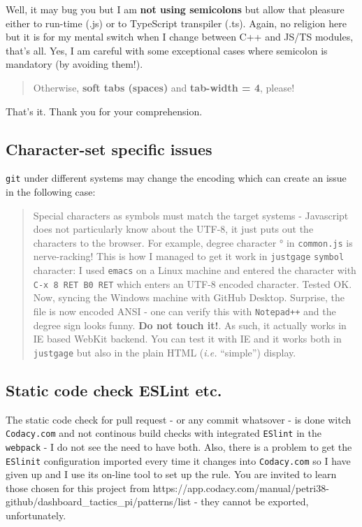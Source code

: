 \documentclass[11pt]{article}
\begin{document}
    Well, it may bug you but I am \textbf{not using semicolons} but allow
that pleasure either to run-time (.js) or to TypeScript transpiler
(.ts). Again, no religion here but it is for my mental switch when I
change between C++ and JS/TS modules, that's all. Yes, I am careful with
some exceptional cases where semicolon is mandatory (by avoiding them!).

\begin{quote}
Otherwise, \textbf{soft tabs (spaces)} and \textbf{tab-width = 4},
please!
\end{quote}

That's it. Thank you for your comprehension.

    \hypertarget{character-set-specific-issues}{%
\subsection{Character-set specific
issues}\label{character-set-specific-issues}}

    \texttt{git} under different systems may change the encoding which can
create an issue in the following case:

    \begin{quote}
Special characters as symbols must match the target systems - Javascript
does not particularly know about the UTF-8, it just puts out the
characters to the browser. For example, degree character ° in
\texttt{common.js} is nerve-racking! This is how I managed to get it
work in \texttt{justgage} \texttt{symbol} character: I used
\texttt{emacs} on a Linux machine and entered the character with
\texttt{C-x\ 8\ RET\ B0\ RET} which enters an UTF-8 encoded character.
Tested OK. Now, syncing the Windows machine with GitHub Desktop.
Surprise, the file is now encoded ANSI - one can verify this with
\texttt{Notepad++} and the degree sign looks funny. \textbf{Do not touch
it!}. As such, it actually works in IE based WebKit backend. You can
test it with IE and it works both in \texttt{justgage} but also in the
plain HTML (\emph{i.e.} ``simple'') display.
\end{quote}

    \hypertarget{static-code-check-eslint-etc.}{%
\subsection{Static code check ESLint
etc.}\label{static-code-check-eslint-etc.}}

    The static code check for pull request - or any commit whatsover - is
done witch \texttt{Codacy.com} and not continous build checks with
integrated \texttt{ESlint} in the \texttt{webpack} - I do not see the
need to have both. Also, there is a problem to get the \texttt{ESlinit}
configuration imported every time it changes into \texttt{Codacy.com} so
I have given up and I use its on-line tool to set up the rule. You are
invited to learn those chosen for this project from
https://app.codacy.com/manual/petri38-github/dashboard\_tactics\_pi/patterns/list
- they cannot be exported, unfortunately.
\end{document}
